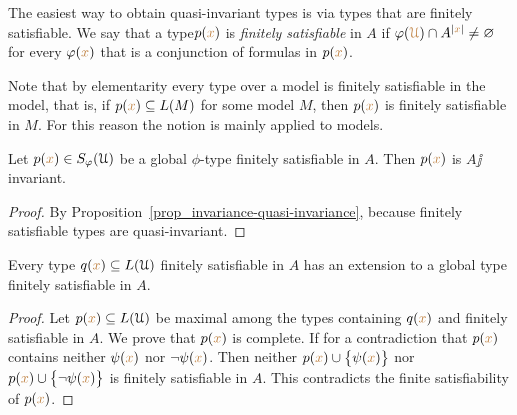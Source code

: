 \documentclass[creche.tex]{subfiles}
\begin{document}
The easiest way to obtain quasi-invariant types is via types that are finitely satisfiable. We say that a type$p({\color{brown} x})$ is  \emph{finitely satisfiable\/} in $A$ if $\varphi({\color{brown}\EuScript U})\cap A^{|{\color{brown} x}|}\neq\varnothing$ for every $\varphi({\color{brown} x})$ that is a conjunction of formulas in $p({\color{brown} x})$.

Note that by elementarity every type over a model is finitely satisfiable in the model, that is, if $p({\color{brown} x})\subseteq L(M)$ for some model $M$, then $p({\color{brown} x})$ is finitely satisfiable in $M$. For this reason the notion is mainly applied to models.

\begin{proposition}\label{prop_coeredi_invarienti}
Let $p({\color{brown} x})\in S_{\varphi}(\EuScript U)$ be a global $\phi$-type finitely satisfiable in $A$. Then $p({\color{brown} x})$ is $A\jj$in\-vari\-ant.
\end{proposition}

\begin{proof}
By Proposition~\ref{prop_invariance-quasi-invariance}, because finitely satisfiable types are quasi-invariant.%
\end{proof}


\begin{proposition}\label{prop_exisntence_coheirs}
Every type $q({\color{brown} x})\subseteq L(\EuScript U)$ finitely satisfiable in $A$ has an extension to a global type finitely satisfiable in $A$.
\end{proposition}

\begin{proof} 
Let $p({\color{brown} x})\subseteq L(\EuScript U)$ be maximal among the types containing $q({\color{brown} x})$ and finitely satisfiable in $A$. We prove that $p({\color{brown} x})$ is complete. If for a contradiction that $p({\color{brown} x})$ contains neither $\psi({\color{brown} x})$ nor $\neg\psi({\color{brown} x})$. Then  neither $p({\color{brown} x})\cup\big\{\psi({\color{brown} x})\big\}$ nor $p({\color{brown} x})\cup\big\{\neg\psi({\color{brown} x})\big\}$ is finitely satisfiable in $A$. This contradicts the finite satisfiability of $p({\color{brown} x})$.
\end{proof}
\end{document}
